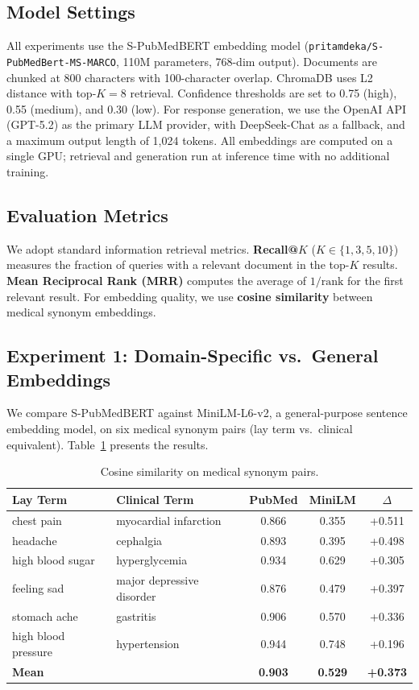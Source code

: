 \documentclass[11pt,a4paper]{article}
\begin{document}
\subsection{Model Settings}

All experiments use the S-PubMedBERT embedding model (\texttt{pritamdeka/\allowbreak S-PubMedBert-MS-MARCO}, 110M parameters, 768-dim output). Documents are chunked at 800 characters with 100-character overlap. ChromaDB uses L2 distance with top-$K{=}8$ retrieval. Confidence thresholds are set to 0.75 (high), 0.55 (medium), and 0.30 (low). For response generation, we use the OpenAI API (GPT-5.2) as the primary LLM provider, with DeepSeek-Chat as a fallback, and a maximum output length of 1,024 tokens. All embeddings are computed on a single GPU; retrieval and generation run at inference time with no additional training.

\subsection{Evaluation Metrics}

We adopt standard information retrieval metrics. \textbf{Recall@$K$} ($K \in \{1,3,5,10\}$) measures the fraction of queries with a relevant document in the top-$K$ results. \textbf{Mean Reciprocal Rank (MRR)} computes the average of $1/\text{rank}$ for the first relevant result. For embedding quality, we use \textbf{cosine similarity} between medical synonym embeddings.

\subsection{Experiment 1: Domain-Specific vs.\ General Embeddings}

We compare S-PubMedBERT against MiniLM-L6-v2, a general-purpose sentence embedding model, on six medical synonym pairs (lay term vs.\ clinical equivalent). Table~\ref{tab:embedding} presents the results.

\begin{table}[t]
\centering
\caption{Cosine similarity on medical synonym pairs.}
\label{tab:embedding}
\begin{tabular}{@{}llccc@{}}
\toprule
\textbf{Lay Term} & \textbf{Clinical Term} & \textbf{PubMed} & \textbf{MiniLM} & \textbf{$\Delta$} \\
\midrule
chest pain       & myocardial infarction  & 0.866 & 0.355 & +0.511 \\
headache         & cephalgia              & 0.893 & 0.395 & +0.498 \\
high blood sugar & hyperglycemia          & 0.934 & 0.629 & +0.305 \\
feeling sad      & major depressive disorder & 0.876 & 0.479 & +0.397 \\
stomach ache     & gastritis              & 0.906 & 0.570 & +0.336 \\
high blood pressure & hypertension        & 0.944 & 0.748 & +0.196 \\
\midrule
\textbf{Mean}    &                        & \textbf{0.903} & \textbf{0.529} & \textbf{+0.373} \\
\bottomrule
\end{tabular}
\end{table}
\end{document}
